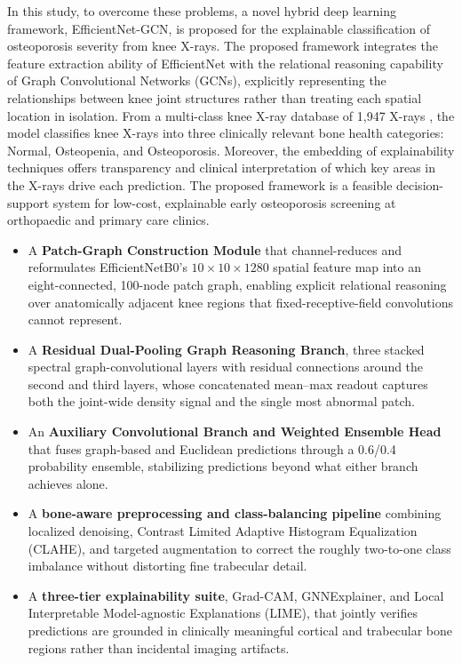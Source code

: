 \documentclass[conference]{IEEEtran}
\begin{document}
In this study, to overcome these problems, a novel hybrid deep learning framework, EfficientNet-GCN, is proposed for the explainable classification of osteoporosis severity from knee X-rays. The proposed framework integrates the feature extraction ability of EfficientNet with the relational reasoning capability of Graph Convolutional Networks (GCNs), explicitly representing the relationships between knee joint structures rather than treating each spatial location in isolation. From a multi-class knee X-ray database of 1,947 X-rays \cite{gobara2024multiclass}, the model classifies knee X-rays into three clinically relevant bone health categories: Normal, Osteopenia, and Osteoporosis. Moreover, the embedding of explainability techniques offers transparency and clinical interpretation of which key areas in the X-rays drive each prediction. The proposed framework is a feasible decision-support system for low-cost, explainable early osteoporosis screening at orthopaedic and primary care clinics.

\begin{itemize}
    \item A \textbf{Patch-Graph Construction Module} that channel-reduces and reformulates EfficientNetB0's $10\times10\times1280$ spatial feature map into an eight-connected, 100-node patch graph, enabling explicit relational reasoning over anatomically adjacent knee regions that fixed-receptive-field convolutions cannot represent.

    \item A \textbf{Residual Dual-Pooling Graph Reasoning Branch}, three stacked spectral graph-convolutional layers with residual connections around the second and third layers, whose concatenated mean--max readout captures both the joint-wide density signal and the single most abnormal patch.

    \item An \textbf{Auxiliary Convolutional Branch and Weighted Ensemble Head} that fuses graph-based and Euclidean predictions through a 0.6/0.4 probability ensemble, stabilizing predictions beyond what either branch achieves alone.

    \item A \textbf{bone-aware preprocessing and class-balancing pipeline} combining localized denoising, Contrast Limited Adaptive Histogram Equalization (CLAHE), and targeted augmentation to correct the roughly two-to-one class imbalance without distorting fine trabecular detail.

    \item A \textbf{three-tier explainability suite}, Grad-CAM, GNNExplainer, and Local Interpretable Model-agnostic Explanations (LIME), that jointly verifies predictions are grounded in clinically meaningful cortical and trabecular bone regions rather than incidental imaging artifacts.
\end{itemize}
\end{document}
